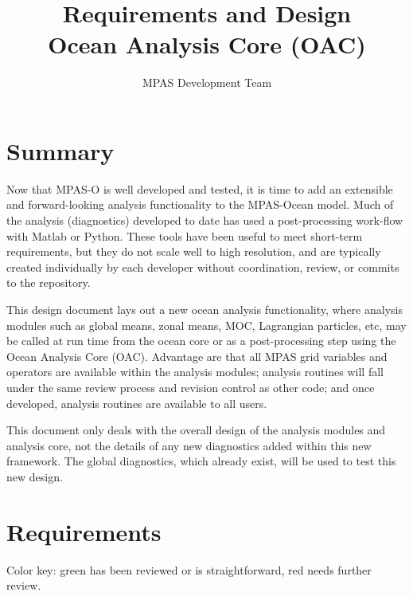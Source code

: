 \documentclass[11pt]{report}
\begin{document}
\title{
Requirements and Design\\
Ocean Analysis Core (OAC)}
\author{MPAS Development Team}

\maketitle
\tableofcontents


\chapter{Summary}

Now that MPAS-O is well developed and tested, it is time to add an extensible and forward-looking analysis functionality to the MPAS-Ocean model.  Much of the analysis (diagnostics) developed to date has used a post-processing work-flow with Matlab or Python.  These tools have been useful to meet short-term requirements, but they do not scale well to high resolution, and are typically created individually by each developer without coordination, review, or commits to the repository.

This design document lays out a new ocean analysis functionality, where analysis modules such as global means, zonal means, MOC, Lagrangian particles, etc, may be called at run time from the ocean core or as a post-processing step using the Ocean Analysis Core (OAC).  Advantage are that all MPAS grid variables and operators are available within the analysis modules; analysis routines will fall under the same review process and revision control as other code; and once developed, analysis routines are available to all users.

This document only deals with the overall design of the analysis modules and analysis core, not the details of any new diagnostics added within this new framework.  The global diagnostics, which already exist, will be used to test this new design. 


\chapter{Requirements}

Color key: {\color{green} green has been reviewed or is straightforward}, {\color{red} red needs further review}.
\end{document}

